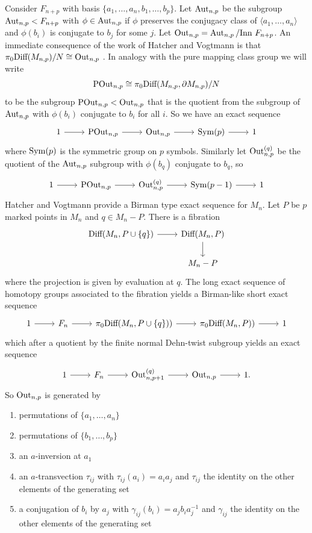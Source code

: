 Consider $F_{n+p}$ with basis $\{a_1,\ldots,a_n, b_1,\ldots, b_p\}$.
Let $\operatorname{Aut}_{n,p}$
be the subgroup $\operatorname{Aut}_{n,p}<F_{n+p}$
with $\phi \in \operatorname{Aut}_{n,p}$
if $\phi$ preserves the conjugacy class of $\langle a_1,\ldots, a_n \rangle$ and $\phi(b_i)$ is conjugate to $b_j$ for some $j$.
Let $\operatorname{Out}_{n,p} = \operatorname{Aut}_{n,p} / \mbox{Inn } F_{n+p}$.
An immediate consequence of the work of Hatcher and Vogtmann is
that $\pi_0 \mbox{Diff}(M_{n,p}) / N \cong \operatorname{Out}_{n,p}$
\cite{homstabout}.
In analogy with the pure mapping class group we will write
$$\operatorname{POut}_{n,p} \cong \pi_0 \mbox{Diff}(M_{n,p}, \partial M_{n,p}) / N$$
to be the subgroup $\operatorname{POut}_{n,p} < \operatorname{Out}_{n,p}$
that is the quotient from the subgroup of $\operatorname{Aut} _{n,p}$ with $\phi(b_i)$ conjugate to $b_i$ for all $i$.
So we have an exact sequence
$$
\begin{tikzcd}
1 \arrow[r] & \pout_{n,p} \arrow[r] & \oout_{n,p} \arrow[r] & \sym(p) \arrow[r] & 1
\end{tikzcd}
$$
where $\operatorname{Sym}(p)$ is the symmetric group on $p$ symbols.
Similarly
let $\operatorname{Out}_{n,p}^{(q)}$
be the quotient of the $\operatorname{Aut}_{n,p}$ subgroup with $\phi(b_q)$ conjugate to $b_q$, so
$$
\begin{tikzcd}
1 \arrow[r] & \pout_{n,p} \arrow[r] & \oout^{(q)}_{n,p} \arrow[r] & \sym(p-1) \arrow[r] & 1
\end{tikzcd}
$$
Hatcher and Vogtmann provide a Birman type exact sequence for $M_n$.
Let $P$ be $p$ marked points in $M_n$ and $q \in M_n-P$.
There is a fibration
$$
\begin{tikzcd}
\mbox{Diff}(M_n,P\cup\{q\}) \arrow[r]&
\mbox{Diff}(M_n,P) \arrow[d]\\
&M_n-P
\end{tikzcd}
$$
where the projection is given by evaluation at $q$.
The  long exact sequence of homotopy groups
associated to the fibration yields a Birman-like short
exact sequence
$$
\begin{tikzcd}
  1 \arrow[r] &
  F_n \arrow[r] &
  \pi_0\mbox{Diff}(M_n,P\cup \{q\})) \arrow[r] &
  \pi_0\mbox{Diff}(M_n,P)) \arrow[r] &
  1
\end{tikzcd}
$$
which after a quotient by the finite normal Dehn-twist subgroup yields an exact sequence
$$
\begin{tikzcd}
  1 \arrow[r] &
  F_n \arrow[r] &
  \oout_{n,p+1}^{(q)} \arrow[r] &
  \oout_{n,p} \arrow[r] &
  1.
\end{tikzcd}
$$
So $\operatorname{Out}_{n,p}$ is generated by
\begin{enumerate}
  \item permutations of $\{a_1,\ldots,a_n\}$
  \item permutations of $\{b_1,\ldots,b_p\}$
  \item an $a$-inversion at $a_1$
  \item an $a$-transvection $\tau_{ij}$ with $\tau_{ij}(a_i)=a_ia_j$
  and $\tau_{ij}$ the identity on the other elements of the generating set
  \item a conjugation of $b_i$ by $a_j$ with $\gamma_{ij}(b_i)=a_jb_ia_j^{-1}$
  and $\gamma_{ij}$ the identity on the other elements of the generating set
\end{enumerate}



